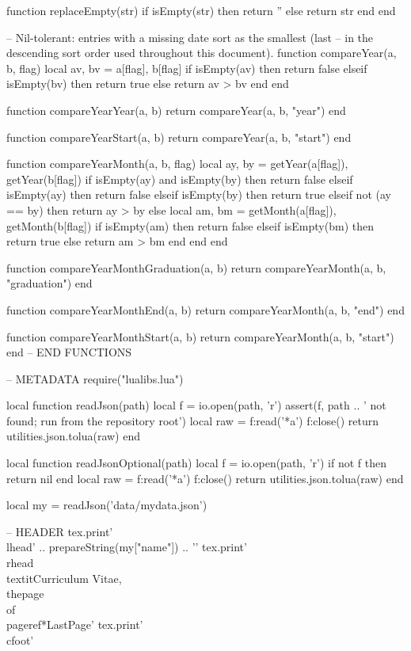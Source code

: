 \documentclass[letterpaper, 10pt]{article}
\begin{document}
\begin{luacode}
	function replaceEmpty(str)
		if isEmpty(str) then
			return ''
		else
			return str
		end
	end

	-- Nil-tolerant: entries with a missing date sort as the smallest (last
	-- in the descending sort order used throughout this document).
	function compareYear(a, b, flag)
		local av, bv = a[flag], b[flag]
		if isEmpty(av) then
			return false
		elseif isEmpty(bv) then
			return true
		else
			return av > bv
		end
	end

	function compareYearYear(a, b)
		return compareYear(a, b, "year")
	end

	function compareYearStart(a, b)
		return compareYear(a, b, "start")
	end

	function compareYearMonth(a, b, flag)
		local ay, by = getYear(a[flag]), getYear(b[flag])
		if isEmpty(ay) and isEmpty(by) then
			return false
		elseif isEmpty(ay) then
			return false
		elseif isEmpty(by) then
			return true
		elseif not (ay == by) then
			return ay > by
		else
			local am, bm = getMonth(a[flag]), getMonth(b[flag])
			if isEmpty(am) then
				return false
			elseif isEmpty(bm) then
				return true
			else
				return am > bm
			end
		end
	end

	function compareYearMonthGraduation(a, b)
		return compareYearMonth(a, b, "graduation")
	end

	function compareYearMonthEnd(a, b)
		return compareYearMonth(a, b, "end")
	end

	function compareYearMonthStart(a, b)
		return compareYearMonth(a, b, "start")
	end
	-- END FUNCTIONS

	-- METADATA
	require("lualibs.lua")

	local function readJson(path)
		local f = io.open(path, 'r')
		assert(f, path .. ' not found; run from the repository root')
		local raw = f:read('*a')
		f:close()
		return utilities.json.tolua(raw)
	end

	local function readJsonOptional(path)
		local f = io.open(path, 'r')
		if not f then return nil end
		local raw = f:read('*a')
		f:close()
		return utilities.json.tolua(raw)
	end

	local my = readJson('data/mydata.json')

	-- HEADER
	tex.print{'\\lhead{' .. prepareString(my["name"]) .. '}'}
	tex.print{'\\rhead{\\textit{Curriculum Vitae, \\thepage\\ of \\pageref*{LastPage}}}'}
	tex.print{'\\cfoot{}'}


\end{luacode}
\end{document}
